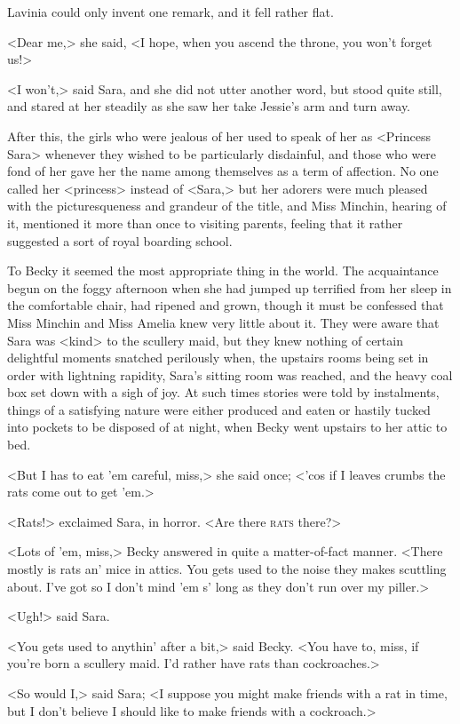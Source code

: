 Lavinia could only invent one remark, and it fell rather flat.

<Dear me,> she said, <I hope, when you ascend the throne, you won't forget us!>

<I won't,> said Sara, and she did not utter another word, but stood quite still, and stared at her steadily as she saw her take Jessie's arm and turn away.

After this, the girls who were jealous of her used to speak of her as <Princess Sara> whenever they wished to be particularly disdainful, and those who were fond of her gave her the name among themselves as a term of affection. No one called her <princess> instead of <Sara,> but her adorers were much pleased with the picturesqueness and grandeur of the title, and Miss Minchin, hearing of it, mentioned it more than once to visiting parents, feeling that it rather suggested a sort of royal boarding school.

To Becky it seemed the most appropriate thing in the world. The acquaintance begun on the foggy afternoon when she had jumped up terrified from her sleep in the comfortable chair, had ripened and grown, though it must be confessed that Miss Minchin and Miss Amelia knew very little about it. They were aware that Sara was <kind> to the scullery maid, but they knew nothing of certain delightful moments snatched perilously when, the upstairs rooms being set in order with lightning rapidity, Sara's sitting room was reached, and the heavy coal box set down with a sigh of joy. At such times stories were told by instalments, things of a satisfying nature were either produced and eaten or hastily tucked into pockets to be disposed of at night, when Becky went upstairs to her attic to bed.

<But I has to eat 'em careful, miss,> she said once; <'cos if I leaves crumbs the rats come out to get 'em.>

<Rats!> exclaimed Sara, in horror. <Are there \textsc{rats} there?>

<Lots of 'em, miss,> Becky answered in quite a matter-of-fact manner. <There mostly is rats an' mice in attics. You gets used to the noise they makes scuttling about. I've got so I don't mind 'em s' long as they don't run over my piller.>

<Ugh!> said Sara.

<You gets used to anythin' after a bit,> said Becky. <You have to, miss, if you're born a scullery maid. I'd rather have rats than cockroaches.>

<So would I,> said Sara; <I suppose you might make friends with a rat in time, but I don't believe I should like to make friends with a cockroach.>

